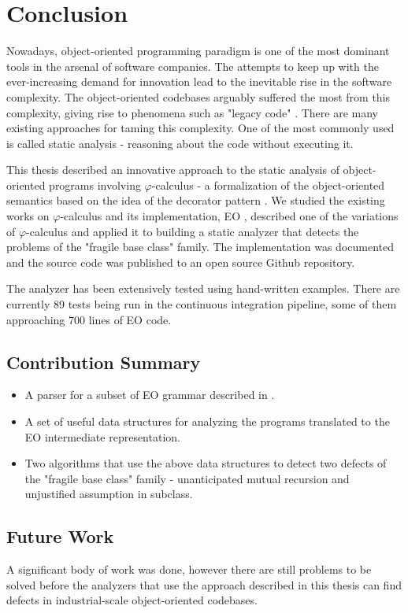 \chapter{Conclusion}
\label{chap:conclusion}

Nowadays, object-oriented programming paradigm is one of the most dominant tools in the arsenal of software companies. The attempts to keep up with the ever-increasing demand for innovation lead to the inevitable rise in the software complexity. The object-oriented codebases arguably suffered the most from this complexity, giving rise to phenomena such as "legacy code" \cite{legacy}. There are many existing approaches for taming this complexity. One of the most commonly used is called static analysis - reasoning about the code without executing it. 

This thesis described an innovative approach to the static analysis of object-oriented programs involving $\varphi$-calculus - a formalization of the object-oriented semantics based on the idea of the decorator pattern \cite{GOFPatterns}. We studied the existing works on $\varphi$-calculus and its implementation, EO \cite{eolang}, described one of the variations of $\varphi$-calculus and applied it to building a static analyzer that detects the problems of the "fragile base class" \cite{fragilebaseclass} family. The implementation was documented and the source code  was published to an open source Github repository.

The analyzer has been extensively tested using hand-written examples. There are currently 89 tests being run in the continuous integration pipeline, some of them approaching 700 lines of EO code. 

\section{Contribution Summary}
\begin{itemize}
    \item A parser for a subset of EO grammar described in \cite{eolang}.
    \item A set of useful data structures for analyzing the programs translated to the EO intermediate representation. 
    \item Two algorithms that use the above data structures to detect two defects of the "fragile base class" family - unanticipated mutual recursion and unjustified assumption in subclass.
\end{itemize}

\section{Future Work}
A significant body of work was done, however there are still problems to be solved before the analyzers that use the approach described in this thesis can find defects in industrial-scale object-oriented codebases. 

